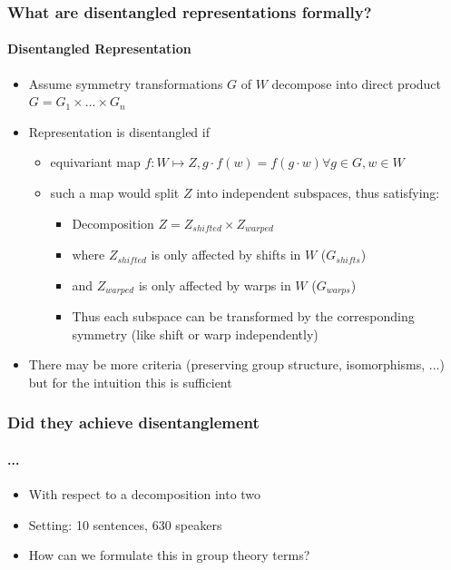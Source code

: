 \documentclass[9pt]{beamer}
\begin{document}
\begin{frame}
\frametitle{What are disentangled representations formally? }
\framesubtitle{Disentangled Representation}
\begin{itemize}%
	\item Assume symmetry transformations $G$ of $W$ decompose into direct product $G = G_1 \times ... \times G_n$
	\item Representation is disentangled if
	\begin{itemize}
		\item equivariant map $f:W \mapsto Z, g \cdot f(w) = f(g\cdot w) \forall g \in G,w \in W$ %
		\item such a map would split $Z$ into independent subspaces, thus satisfying:
		\begin{itemize}
			\item Decomposition $Z = Z_{shifted} \times Z_{warped}$
			\item where $Z_{shifted}$ is only affected by shifts in $W$ ($G_{shifts}$)
			\item and $Z_{warped}$ is only affected by warps in $W$ ($G_{warps}$) %
			\item Thus each subspace can be transformed by the corresponding symmetry (like shift or warp independently)
		\end{itemize}
	\end{itemize}
	\item There may be more criteria (preserving group structure, isomorphisms, ...) but for the intuition this is sufficient
\end{itemize}
\end{frame} 




\begin{frame}
\frametitle{Did they achieve disentanglement}
\framesubtitle{...}
\begin{itemize}%
	\item With respect to a decomposition into two
	\item Setting: 10 sentences, 630 speakers
	\item How can we formulate this in group theory terms?
\end{itemize}
\end{frame} 
\end{document}
